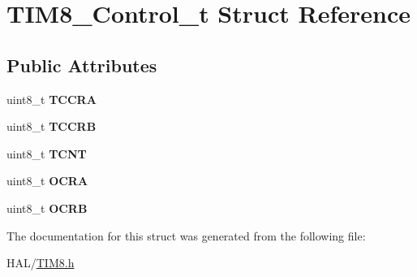 \hypertarget{struct_t_i_m8___control__t}{}\section{T\+I\+M8\+\_\+\+Control\+\_\+t Struct Reference}
\label{struct_t_i_m8___control__t}
\subsection*{Public Attributes}
\begin{DoxyCompactItemize}
\item 
\mbox{\label{struct_t_i_m8___control__t_a8d332dcb1b303154215b1961478ed4fc}} 
uint8\+\_\+t {\bfseries T\+C\+C\+RA}
\item 
\mbox{\label{struct_t_i_m8___control__t_af9cd4b2bfbce0a7defea7ecd79093936}} 
uint8\+\_\+t {\bfseries T\+C\+C\+RB}
\item 
\mbox{\label{struct_t_i_m8___control__t_aba8b3d20e2498ab63ccc8a57a5cc3ae0}} 
uint8\+\_\+t {\bfseries T\+C\+NT}
\item 
\mbox{\label{struct_t_i_m8___control__t_a89cf845988388a62f90ed6d939247c54}} 
uint8\+\_\+t {\bfseries O\+C\+RA}
\item 
\mbox{\label{struct_t_i_m8___control__t_a775440b1439cefb5fc61e4b214ee4530}} 
uint8\+\_\+t {\bfseries O\+C\+RB}
\end{DoxyCompactItemize}


The documentation for this struct was generated from the following file\+:\begin{DoxyCompactItemize}
\item 
H\+A\+L/\mbox{\hyperlink{_t_i_m8_8h}{T\+I\+M8.\+h}}\end{DoxyCompactItemize}
